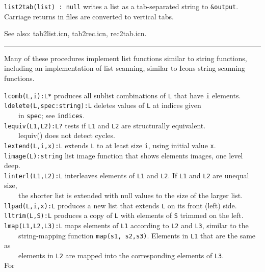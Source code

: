 \texttt{list2tab(list) : null} writes a list as a tab-separated string
to \texttt{\&output}. Carriage returns in files are converted to
vertical tabs.

See also: tab2list.icn, tab2rec.icn, rec2tab.icn. 

\vspace{0.25cm}\hrule{}

Many of these procedures implement list functions
similar to string functions, including an implementation of
list scanning, similar to Icon{\textquotesingle}s
string scanning functions.

\texttt{lcomb(L,i):L*} produces all sublist combinations of \texttt{L}
that have \texttt{i} elements.\\
\texttt{ldelete(L,spec:string):L} deletes values of \texttt{L} at
indices given\\
 \ \ \ \ in \texttt{spec}; see \texttt{indices}.\\
\texttt{lequiv(L1,L2):L?} tests if \texttt{L1} and \texttt{L2} are
structurally equivalent.\\
 \ \ \ \ lequiv() does not detect cycles.\\
\texttt{lextend(L,i,x):L} extends \texttt{L} to at least size
\texttt{i}, using initial value \texttt{x}.\\
\texttt{limage(L):string} list image function that shows
elements{\textquotesingle} images, one level deep.\\
\texttt{linterl(L1,L2):L} interleaves elements of \texttt{L1} and
\texttt{L2}. If \texttt{L1} and \texttt{L2} are unequal size,\\
 \ \ \ \ the shorter list is extended with null values to the
size of the larger list.\\
\texttt{llpad(L,i,x):L} produces a new list that extends \texttt{L} on
its front (left) side.\\
\texttt{lltrim(L,S):L} produces a copy of \texttt{L} with elements of
\texttt{S} trimmed on the left.\\
\texttt{lmap(L1,L2,L3):L} maps elements of \texttt{L1} according to
\texttt{L2} and \texttt{L3}, similar to the\\
 \ \ \ \ string-mapping function \texttt{map(s1, s2,s3)}. Elements in
\texttt{L1} that are the same as\\
 \ \ \ \  elements in \texttt{L2} are mapped into the corresponding elements of \texttt{L3}.\\ For
